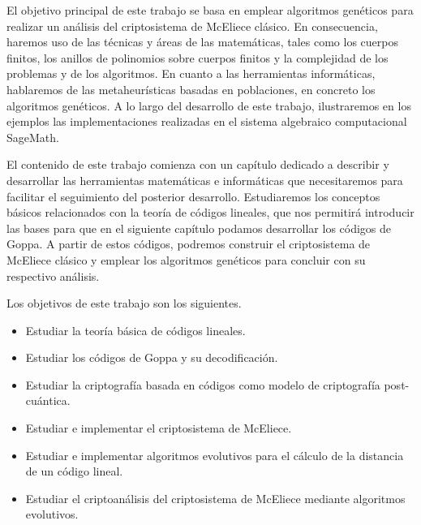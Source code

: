 
El objetivo principal de este trabajo se basa en emplear algoritmos genéticos para realizar un análisis del criptosistema de McEliece clásico. En consecuencia, haremos uso de las técnicas y áreas de las matemáticas, tales como los cuerpos finitos, los anillos de polinomios sobre cuerpos finitos y la complejidad de los problemas y de los algoritmos. En cuanto a las herramientas informáticas, hablaremos de las metaheurísticas basadas en poblaciones, en concreto los algoritmos genéticos. A lo largo del desarrollo de este trabajo, ilustraremos en los ejemplos las implementaciones realizadas en el sistema algebraico computacional SageMath.


El contenido de este trabajo comienza con un capítulo dedicado a describir y desarrollar las herramientas matemáticas e informáticas que necesitaremos para facilitar el seguimiento del posterior desarrollo. Estudiaremos los conceptos básicos relacionados con la teoría de códigos lineales, que nos permitirá introducir las bases para que en el siguiente capítulo podamos desarrollar los códigos de Goppa. A partir de estos códigos, podremos construir el criptosistema de McEliece clásico y emplear los algoritmos genéticos para concluir con su respectivo análisis.


Los objetivos de este trabajo son los siguientes.

\begin{itemize}
    \item Estudiar la teoría básica de códigos lineales.
    \item Estudiar los códigos de Goppa y su decodificación.
    \item Estudiar la criptografía basada en códigos como modelo de criptografía post-cuántica.
    \item Estudiar e implementar el criptosistema de McEliece.
    \item Estudiar e implementar algoritmos evolutivos para el cálculo de la distancia de un código lineal.
    \item Estudiar el criptoanálisis del criptosistema de McEliece mediante algoritmos evolutivos.
\end{itemize}